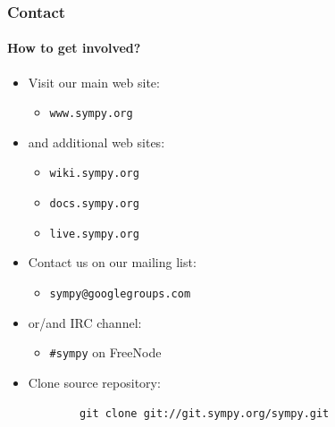 \documentclass[handout]{beamer}
\begin{document}
\begin{frame}[fragile]
    \frametitle{Contact}
    \framesubtitle{How to get involved?}

    \begin{itemize}
        \item Visit our main web site:
            \begin{itemize}
                \item \texttt{www.sympy.org}
            \end{itemize}
        \item and additional web sites:
            \begin{itemize}
                \item \texttt{wiki.sympy.org}
                \item \texttt{docs.sympy.org}
                \item \texttt{live.sympy.org}
            \end{itemize}
        \item Contact us on our mailing list:
            \begin{itemize}
                \item \texttt{sympy@googlegroups.com}
            \end{itemize}
        \item or/and IRC channel:
            \begin{itemize}
                \item \texttt{\#sympy} on FreeNode
            \end{itemize}
        \item Clone source repository:
        \begin{verbatim}
        git clone git://git.sympy.org/sympy.git
        \end{verbatim}
    \end{itemize}
\end{frame}
\end{document}
